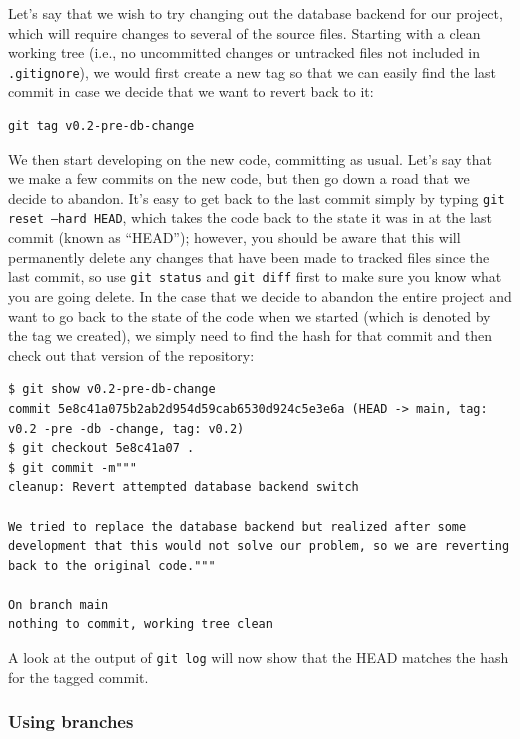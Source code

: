 Let's say that we wish to try changing out the database backend for our project, which will require changes to several of the source files.
Starting with a clean working tree (i.e., no uncommitted changes or untracked files not included in \texttt{.gitignore}), we would first create a new tag so that we can easily find the last commit in case we decide that we want to revert back to it:

\begin{lstlisting}[style=shellshort]
git tag v0.2-pre-db-change
\end{lstlisting}

We then start developing on the new code, committing as usual.
Let's say that we make a few commits on the new code, but then go down a road that we decide to abandon.
It's easy to get back to the last commit simply by typing \texttt{git reset --hard HEAD}, which takes the code back to the state it was in at the last commit (known as ``HEAD''); however, you should be aware that this will permanently delete any changes that have been made to tracked files since the last commit, so use \texttt{git status} and \texttt{git diff} first to make sure you know what you are going delete.
In the case that we decide to abandon the entire project and want to go back to the state of the code when we started (which is denoted by the tag we created), we simply need to find the hash for that commit and then check out that version of the repository:

\begin{lstlisting}[style=shell]
$ git show v0.2-pre-db-change
commit 5e8c41a075b2ab2d954d59cab6530d924c5e3e6a (HEAD -> main, tag: v0.2 -pre -db -change, tag: v0.2)
$ git checkout 5e8c41a07 .
$ git commit -m"""
cleanup: Revert attempted database backend switch

We tried to replace the database backend but realized after some
development that this would not solve our problem, so we are reverting
back to the original code."""

On branch main
nothing to commit, working tree clean
\end{lstlisting}

A look at the output of \texttt{git log} will now show that the HEAD matches the hash for the tagged commit.

\subsubsection{Using branches}

